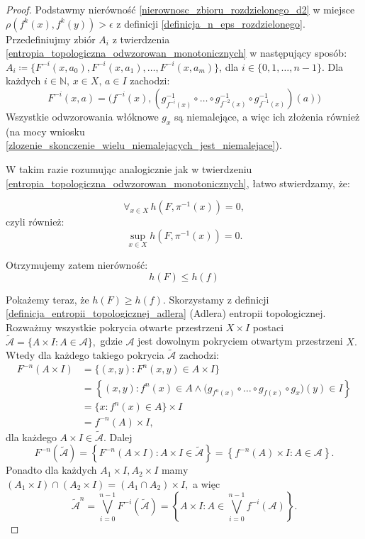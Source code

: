 \documentclass[licencjacka]{pwr_wmat_praca_dyplomowa}
\theoremstyle{plain}
\numberwithin{theorem}{chapter}
\theoremstyle{definition}
\numberwithin{theorem}{chapter}
\begin{document}
\begin{proof}
 Podstawmy nierówność \ref{nierownosc_zbioru_rozdzielonego_d2} w miejsce $\rho(f^k(x), f^k(y)) > \epsilon$ z definicji \ref{definicja_n_eps_rozdzielonego}. Przedefiniujmy zbiór $A_i$  z twierdzenia \ref{entropia_topologiczna_odwzorowan_monotonicznych} w następujący sposób:
 $A_i \coloneqq \{F^{-i}(x, a_0), F^{-i}(x, a_1), \ldots, F^{-i}(x, a_m)\}$, dla $i \in \{0, 1, \ldots, n-1\}.$ 
Dla każdych $i \in \mathbb{N}, \, x \in X, \, a \in I$ zachodzi:
$$F^{-i}(x, a) = \big( f^{-i}(x), (g_{f^{-i}(x)}^{-1}\circ \ldots \circ g_{f^{-2}(x)}^{-1} \circ g_{f^{-1}(x)}^{-1})(a) \big)$$
Wszystkie odwzorowania włóknowe $g_x$ są niemalejące, a więc ich złożenia również (na mocy wniosku \ref{zlozenie_skonczenie_wielu_niemalejacych_jest_niemalejace}).

W takim razie rozumując analogicznie jak w twierdzeniu \ref{entropia_topologiczna_odwzorowan_monotonicznych}, łatwo stwierdzamy, że:

$$\forall_{x \in X} \, h(F, \pi^{-1}(x)) = 0,$$
czyli również:
$$\sup_{x \in X} h(F, \pi^{-1}(x)) = 0.$$



Otrzymujemy zatem nierówność:
\begin{equation}
\label{twierdzenie_o_rownosci_entropii_nierownosc_pierwsza}
h(F) \leq h(f)
\end{equation}


Pokażemy teraz, że $h(F) \geq h(f).$
Skorzystamy z definicji \ref{definicja_entropii_topologicznej_adlera} (Adlera) entropii topologicznej. Rozważmy wszystkie pokrycia otwarte przestrzeni $X \times I$ postaci $\widetilde{\mathcal{A}} = \{A \times I : A \in \mathcal{A}\},$ gdzie $\mathcal{A}$ jest dowolnym pokryciem otwartym przestrzeni $X.$ Wtedy dla każdego takiego pokrycia $\widetilde{\mathcal{A}}$ zachodzi:
\begin{align*}
F^{-n}(A \times I) & = \{(x,y): F^n(x,y) \in A \times I\} \\
& = \left\{(x,y): f^n(x) \in A \wedge \big(g_{f^n(x)} \circ \ldots \circ g_{f(x)} \circ g_x\big)(y) \in I\right\} \\
& = \{x : f^n(x) \in A\} \times I \\
& = f^{-n}(A) \times I,
\end{align*}
dla każdego $A \times I \in \widetilde{\mathcal{A}}.$ 
Dalej 
$$F^{-n}\left(\widetilde{\mathcal{A}}\right) = \left\{F^{-n}(A \times I) : A \times I \in \widetilde{\mathcal{A}}\right\} = \left\{f^{-n}(A) \times I : A \in \mathcal{A}\right\}.$$
Ponadto dla każdych $A_1 \times I, A_2 \times I$ mamy $(A_1 \times I) \cap (A_2 \times I) = (A_1 \cap A_2) \times I,$ a więc $${\widetilde{\mathcal{A}}}^n = \bigvee_{i=0}^{n-1}F^{-i}\left(\widetilde{\mathcal{A}}\right) = \left\{A \times I : A \in \bigvee_{i=0}^{n-1}f^{-i}({\mathcal{A}}) \right\}.$$


\end{proof}
\end{document}
